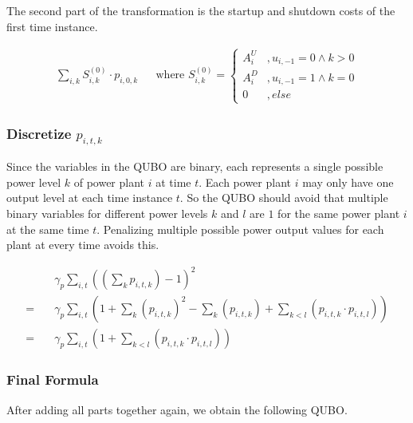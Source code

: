 The second part of the transformation is the startup and shutdown costs of the first time instance.

\begin{align}
  \sum_{i, k} S_{i, k}^{(0)} \cdot p_{i, 0, k}
  & & \text{where }
  S_{i, k}^{(0)} = \begin{cases}
    A_i^U & , u_{i, -1} = 0 \land k > 0 \\
    A_i^D & , u_{i, -1} = 1 \land k = 0 \\
    0 & , else
  \end{cases}
\end{align}

\subsubsection{Discretize $p_{i, t, k}$}

Since the variables in the QUBO are binary, each represents a single possible power level $k$ of power plant $i$ at time $t$.
Each power plant $i$ may only have one output level at each time instance $t$.
So the QUBO should avoid that multiple binary variables for different power levels $k$ and $l$ are $1$ for the same power plant $i$ at the same time $t$.
Penalizing multiple possible power output values for each plant at every time avoids this.

\begin{subequations}
\begin{align}
  & \gamma_p \sum_{i, t} \left( \left( \sum_k p_{i, t, k} \right) - 1 \right)^2
  \\ = \quad &
  \gamma_p \sum_{i, t} \left(
    1
    + \sum_k \left( p_{i, t, k} \right)^2
    - \sum_k \left( p_{i, t, k} \right)
    + \sum_{k < l} \left( p_{i, t, k} \cdot p_{i, t, l} \right)
  \right)
  \\ = \quad &
  \gamma_p \sum_{i, t} \left(
    1
    + \sum_{k < l} \left( p_{i, t, k} \cdot p_{i, t, l} \right)
  \right)
\end{align}
\end{subequations}

\subsubsection{Final Formula}

After adding all parts together again, we obtain the following QUBO.

